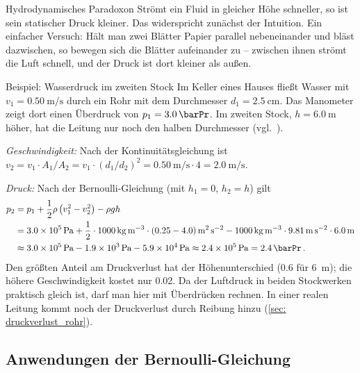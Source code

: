 \begin{rememberbox}{Hydrodynamisches Paradoxon}
    Strömt ein Fluid in gleicher Höhe schneller, so ist sein statischer Druck kleiner. Das widerspricht zunächst der Intuition. Ein einfacher Versuch: Hält man zwei Blätter Papier parallel nebeneinander und bläst dazwischen, so bewegen sich die Blätter aufeinander zu -- zwischen ihnen strömt die Luft schnell, und der Druck ist dort kleiner als außen.
\end{rememberbox}

\begin{examplebox}[]{Beispiel: Wasserdruck im zweiten Stock}
    Im Keller eines Hauses fließt Wasser mit $v_1 = \SI{0.50}{\meter\per\second}$ durch ein Rohr mit dem Durchmesser $d_1 = \SI{2.5}{\centi\meter}$. Das Manometer zeigt dort einen Überdruck von $p_1 = \SI{3.0}{\barPr}$. Im zweiten Stock, $h = \SI{6.0}{\meter}$ höher, hat die Leitung nur noch den halben Durchmesser (vgl.~\cite[S.~465]{Giancoli2010}).

    \textit{Geschwindigkeit:} Nach der Kontinuitätsgleichung ist $v_2 = v_1 \cdot A_1/A_2 = v_1 \cdot (d_1/d_2)^2 = \SI{0.50}{\meter\per\second} \cdot 4 = \SI{2.0}{\meter\per\second}$.

    \textit{Druck:} Nach der Bernoulli-Gleichung (mit $h_1 = 0$, $h_2 = h$) gilt
    \begin{align*}
        p_2 &= p_1 + \frac{1}{2}\rho \left(v_1^2 - v_2^2\right) - \rho g h \\
        &= \SI{3.0e5}{\pascal} + \frac{1}{2} \cdot \SI{1000}{\kilogram\per\meter\cubed} \cdot \left(\num{0.25} - \num{4.0}\right) \si{\meter\squared\per\second\squared} - \SI{1000}{\kilogram\per\meter\cubed} \cdot \SI{9.81}{\meter\per\second\squared} \cdot \SI{6.0}{\meter} \\
        &\approx \SI{3.0e5}{\pascal} - \SI{1.9e3}{\pascal} - \SI{5.9e4}{\pascal} \approx \SI{2.4e5}{\pascal} = \SI{2.4}{\barPr} \mDot
    \end{align*}
    Den größten Anteil am Druckverlust hat der Höhenunterschied (\SI{0.6}{\barPr} für \SI{6}{\meter}); die höhere Geschwindigkeit kostet nur \SI{0.02}{\barPr}. Da der Luftdruck in beiden Stockwerken praktisch gleich ist, darf man hier mit Überdrücken rechnen. In einer realen Leitung kommt noch der Druckverlust durch Reibung hinzu (\cref{sec: druckverlust_rohr}).
\end{examplebox}

\subsection{Anwendungen der Bernoulli-Gleichung}\label{subsec: bernoulli_anwendungen}

